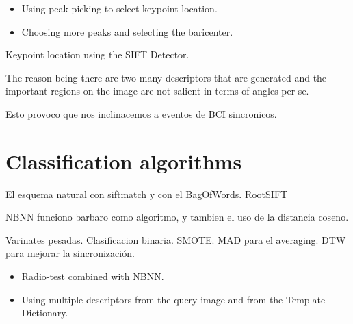\begin{itemize}
\item Using peak-picking to select keypoint location.
\item Choosing more peaks and selecting the baricenter.
\end{itemize}
Keypoint location using the SIFT Detector.

The reason being there are two many descriptors that are generated and the important regions on the image are not salient in terms of angles per se.

Esto provoco que nos inclinacemos a eventos de BCI sincronicos.


\section{Classification algorithms}

El esquema natural con siftmatch y con el BagOfWords.
RootSIFT

NBNN funciono barbaro como algoritmo, y tambien el uso de la distancia coseno.

Varinates pesadas.  Clasificacion binaria.  SMOTE.   MAD para el averaging.   DTW para mejorar la sincronización.

\begin{itemize}
\item Radio-test combined with NBNN.
\item Using multiple descriptors from the query image and from the Template Dictionary.
\end{itemize}

